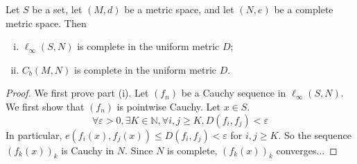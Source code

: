 \begin{theorem}
    Let \( S \) be a set, let \( (M,d) \) be a metric space, and let \( (N,e) \) be a complete metric space.
    Then
    \begin{enumerate}[(i)]
        \item \( \ell_\infty(S,N) \) is complete in the uniform metric \( D \);
        \item \( C_b(M,N) \) is complete in the uniform metric \( D \).
    \end{enumerate}
\end{theorem}
\begin{proof}
    We first prove part (i).
    Let \( (f_n) \) be a Cauchy sequence in \( \ell_\infty(S, N) \).
    We first show that \( (f_n) \) is pointwise Cauchy.
    Let \( x \in S \).
    \[ \forall \varepsilon > 0, \exists K \in \mathbb N, \forall i,j \geq K, D(f_i, f_j) < \varepsilon \]
    In particular, \( e(f_i(x), f_j(x)) \leq D(f_i,f_j) < \varepsilon \) for \( i,j \geq K \).
    So the sequence \( (f_k(x))_k \) is Cauchy in \( N \).
    Since \( N \) is complete, \( (f_k(x))_k \) converges...
\end{proof}
